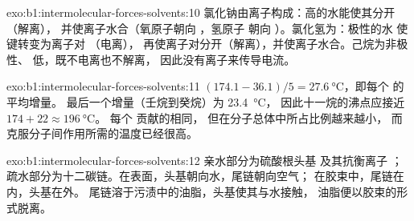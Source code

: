 \begin{solution}{exo:b1:intermolecular-forces-solvents:10}
氯化钠由离子构成：高的水能使其分开（解离），
并使离子水合（氧原子朝向 ，氢原子
朝向 ）。氯化氢为：极性的水
使  键转变为离子对 （电离），
再使离子对分开（解离），并使离子水合。己烷为非极性、
低，既不电离也不解离，
因此没有离子来传导电流。
\end{solution}

\begin{solution}{exo:b1:intermolecular-forces-solvents:11}
$(174.1 - 36.1)/5 = \qty{27.6}{\celsius}$，即每个  的平均增量。
最后一个增量（壬烷到癸烷）为 \qty{23.4}{\celsius}，
因此十一烷的沸点应接近 $174 + 22 \approx \qty{196}{\celsius}$。
每个  贡献的相同，
但在分子总体中所占比例越来越小，
而克服分子间作用所需的温度已经很高。
\end{solution}

\begin{solution}{exo:b1:intermolecular-forces-solvents:12}
亲水部分为硫酸根头基  及其抗衡离子 ；
疏水部分为十二碳链。在表面，头基朝向水，尾链朝向空气；
在胶束中，尾链在内，头基在外。
尾链溶于污渍中的油脂，头基使其与水接触，
油脂便以胶束的形式脱离。
\end{solution}

